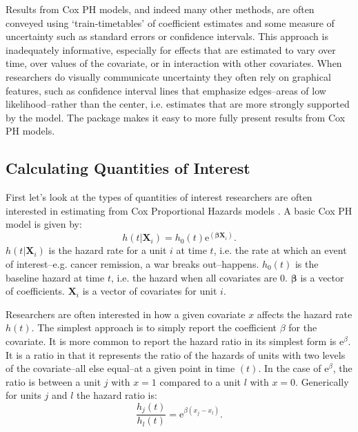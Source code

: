 \documentclass[nojss]{jss}\usepackage{graphicx, color}
\begin{document}
Results from Cox PH models, and indeed many other methods, are often conveyed using `train-timetables' of coefficient estimates and some measure of uncertainty such as standard errors or confidence intervals. This approach is inadequately informative, especially for effects that are estimated to vary over time, over values of the covariate, or in interaction with other covariates. When researchers do visually communicate uncertainty they often rely on graphical features, such as confidence interval lines that emphasize edges--areas of low likelihood--rather than the center, i.e. estimates that are more strongly supported by the model. The  package makes it easy to more fully present results from Cox PH models.


\subsection{Calculating Quantities of Interest}

First let's look at the types of quantities of interest researchers are often interested in estimating from Cox Proportional Hazards models \citep{cox1972}. A basic Cox PH model is given by:
%
\begin{equation}
    h(t|\mathbf{X}_{i}) = h_{0}(t)\mathrm{e}^{(\mathbf{\beta X}_{i})}.
\end{equation}
%
$h(t|\mathbf{X}_{i})$ is the hazard rate for a unit $i$ at time $t$, i.e. the rate at which an event of interest--e.g. cancer remission, a war breaks out--happens. $h_{0}(t)$ is the baseline hazard at time $t$, i.e. the hazard when all covariates are 0. $\mathbf{\beta}$ is a vector of coefficients. $\mathbf{X}_{i}$ is a vector of covariates for unit $i$.

Researchers are often interested in how a given covariate $x$ affects the hazard rate $h(t)$. The simplest approach is to simply report the coefficient $\beta$ for the covariate. It is more common to report the hazard ratio in its simplest form is $\mathrm{e}^{\beta}$. It is a ratio in that it represents the ratio of the hazards of units with two levels of the covariate--all else equal--at a given point in time $(t)$. In the case of $\mathrm{e}^{\beta}$, the ratio is between a unit $j$ with $x = 1$ compared to a unit $l$ with $x = 0$. Generically for units $j$ and $l$ the hazard ratio is:
%
\begin{equation}
	\frac{h_{j}(t)}{h_{l}(t)} = \mathrm{e}^{\beta(x_{j} - x_{l})}.
\end{equation}
\end{document}
